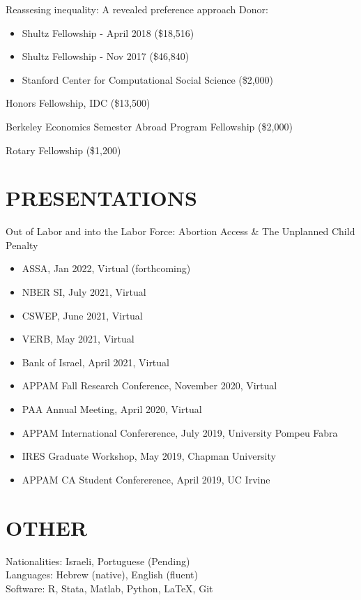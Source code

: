 \documentclass[margin]{res} %
\begin{document}
\begin{resume}
Reassesing inequality: A revealed preference approach
Donor: 
\begin{itemize}
	\item Shultz Fellowship - April 2018 (\$18,516)
	\item Shultz Fellowship - Nov 2017 (\$46,840)
	\item Stanford Center for Computational Social Science (\$2,000) 
\end{itemize}	

Honors Fellowship, IDC (\$13,500) 

Berkeley Economics Semester Abroad Program Fellowship (\$2,000) 

Rotary Fellowship (\$1,200) 

 
\section{PRESENTATIONS} 
\vspace{5mm} 
Out of Labor and into the Labor Force: Abortion Access \& The Unplanned Child Penalty
\begin{itemize}
	\item ASSA, Jan 2022, Virtual (forthcoming)
	\item NBER SI, July 2021, Virtual
	\item CSWEP, June 2021, Virtual
	\item VERB, May 2021, Virtual
	\item Bank of Israel, April 2021, Virtual
	\item APPAM Fall Research Conference, November 2020, Virtual
	\item PAA Annual Meeting, April 2020, Virtual
	\item APPAM International Confererence, July 2019, University Pompeu Fabra
	\item IRES Graduate Workshop, May 2019, Chapman University
	\item APPAM CA Student Confererence, April 2019, UC Irvine
\end{itemize}

 
\section{OTHER} 
Nationalities: Israeli, Portuguese (Pending) \\
Languages: Hebrew (native), English (fluent) \\
Software: R, Stata, Matlab, Python, \LaTeX, Git


\end{resume}
\end{document}
